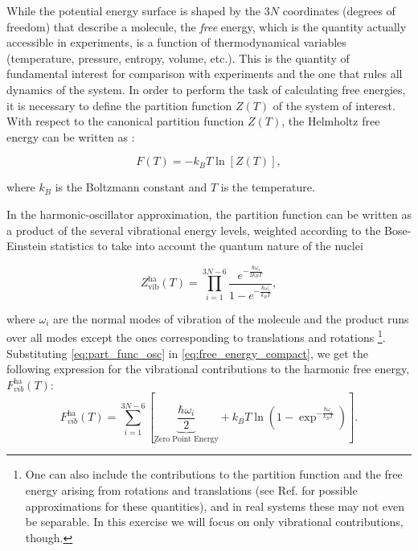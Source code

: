 \documentclass[a4paper,11pt]{scrartcl}
\begin{document}
While the potential energy surface is shaped by the 3$N$ coordinates (degrees of freedom)
that describe a molecule, the \textit{free} energy, which is the quantity
actually accessible in experiments, is a function of thermodynamical variables (temperature,
pressure, entropy, volume, etc.).
This is the quantity of fundamental interest for comparison with experiments
and the one that rules all dynamics of the system.
In order to perform the task of calculating free energies, it is necessary to define
the partition function $Z(T)$ of the system of interest.
With respect to the canonical partition function $Z(T)$,
the Helmholtz free energy can be written as \cite{mcquarrie}:

\begin{equation}
F (T) = -k_B T \ln [Z(T)], %
\label{eq:free_energy_compact}
\end{equation}

\noindent where $k_B$ is the Boltzmann constant and $T$ is the temperature.



In the harmonic-oscillator approximation,
the  partition function can be
written as a product of the several vibrational energy levels,
weighted according to the Bose-Einstein statistics to take
into account the quantum nature of the nuclei


\begin{equation}
Z_{\text{vib}}^{\text{ha}}(T)=\prod_{i=1}^{3N-6} \frac{e^{-\frac{\hbar \omega_i}{2k_B T}}}{1-e^{-\frac{\hbar \omega_i}{k_B T}}},
\label{eq:part_func_osc}
\end{equation}

\noindent where $\omega_i$ are the normal modes of vibration of the molecule and the product runs over all modes except the ones corresponding to translations and rotations \footnote{One can also include the contributions to the partition function and the free energy arising from rotations and translations (see Ref. \cite{mcquarrie} for possible approximations for these quantities), and in real systems these may not even be separable. In this exercise we will focus on only vibrational contributions, though.}. Substituting \ref{eq:part_func_osc} in \ref{eq:free_energy_compact}, we get the following expression for the vibrational
contributions to the harmonic free energy, $F^{\text{ha}}_{\textit{vib}} (T)$:
\begin{equation}
F^{\text{ha}}_{\textit{vib}} (T) = \sum_{i=1}^{3N-6} \left[ \underbrace{\frac{\hbar \omega_i}{2}}_{\text{Zero Point Energy}} + k_B T \ln\left(1-\exp^{-\frac{\hbar \omega_i}{k_B T}}\right)\right].
\label{eq:free_energy}
\end{equation}
\end{document}
